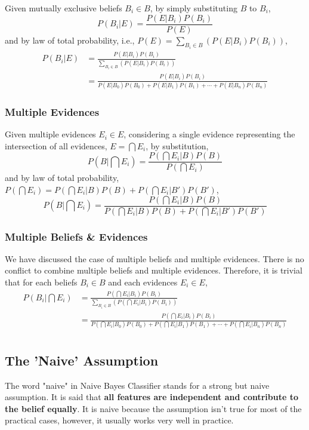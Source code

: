 \documentclass{note}
\begin{document}
Given mutually exclusive beliefs $B_i \in B$, by simply substituting $B$ to $B_i$,
$$
P(B_i|E) = \frac{P(E|B_i)P(B_i)}{P(E)}
$$
and by law of total probability, i.e., $P(E) = \sum_{B_i \in B} \left(P(E|B_i)P(B_i)\right)$,
\begin{align*}
P(B_i|E) 
& = \frac{P(E|B_i)P(B_i)}{\sum_{B_i \in B} \left(P(E|B_i)P(B_i)\right)} \\
& = \frac{P(E|B_i)P(B_i)}{P(E|B_0)P(B_0) + P(E|B_1)P(B_1) + \cdots + P(E|B_n)P(B_n)}
\end{align*}

\subsubsection{Multiple Evidences}

Given multiple evidences $E_i \in E$, considering a single evidence representing the intersection of all evidences, $E = \bigcap E_i$, by substitution, 
$$
P(B|\bigcap E_i) = \frac{P(\bigcap E_i|B)P(B)}{P(\bigcap E_i)}
$$
and by law of total probability, $P(\bigcap E_i) = P(\bigcap E_i|B)P(B) + P(\bigcap E_i|B')P(B')$,
$$
P(B|\bigcap E_i) = \frac{P(\bigcap E_i|B)P(B)}{P(\bigcap E_i|B)P(B) + P(\bigcap E_i|B')P(B')}
$$

\subsubsection{Multiple Beliefs \& Evidences}

We have discussed the case of multiple beliefs and multiple evidences. There is no conflict to combine multiple beliefs and multiple evidences. Therefore, it is trivial that for each beliefs $B_i \in B$ and each evidences $E_i \in E$,
\begin{align*}
P(B_i|\bigcap E_i) 
& = \frac{P(\bigcap E_i|B_i)P(B_i)}{\sum_{B_i \in B} \left(P(\bigcap E_i|B_i)P(B_i)\right)} \\
& = \frac{P(\bigcap E_i|B_i)P(B_i)}{P(\bigcap E_i|B_0)P(B_0) + P(\bigcap E_i|B_1)P(B_1) + \cdots + P(\bigcap E_i|B_n)P(B_n)} \\
\end{align*}

\subsection{The 'Naive' Assumption}

The word "naive" in Naive Bayes Classifier stands for a strong but naive assumption. It is said that \textbf{all features are independent and contribute to the belief equally}. It is naive because the assumption isn't true for most of  the practical cases, however, it usually works very well in practice.
\end{document}
